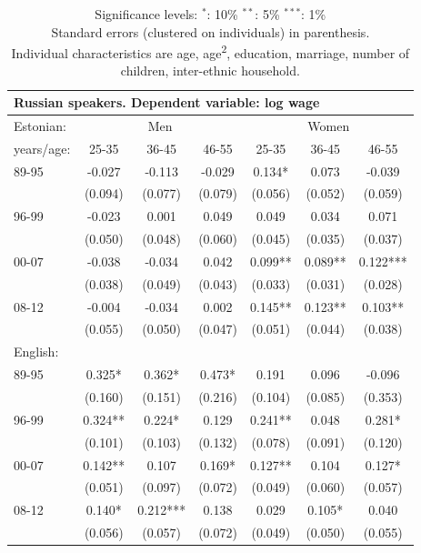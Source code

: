 \documentclass[12pt, a4paper]{article}
\def\tenpc{$^{\ast}$}
\def\fivepc{$^{\ast\ast}$}
\def\onepc{$^{\ast\ast\ast}$}
\newcommand{\legend}{\normalsize{Significance levels:\hspace{1em} \tenpc : 10\% \hspace{1em} \fivepc : 5\% \hspace{1em} \onepc : 1\% \normalsize}}
\newcommand{\modelTwo}{age, age\textsuperscript{2}, education, marriage, number of children, inter-ethnic household}
\begin{document}
\begin{table}[htbp]
\begin{tabular}{lccc|cc c}
          \midrule
		\multicolumn{7}{l}{Russian speakers. Dependent variable: log wage}\\
		\midrule
		Estonian:&\multicolumn{3}{c|}{Men} &\multicolumn{3}{c}{Women}\\
		years/age: & 25-35   & 36-45    & 46-55   & 25-35   & 36-45   & 46-55    \\
		\midrule
		89-95      & -0.027  & -0.113   & -0.029  & 0.134*  & 0.073   & -0.039   \\
		           & (0.094) & (0.077)  & (0.079) & (0.056) & (0.052) & (0.059)  \\
		96-99      & -0.023  & 0.001    & 0.049   & 0.049   & 0.034   & 0.071    \\
		           & (0.050) & (0.048)  & (0.060) & (0.045) & (0.035) & (0.037)  \\
		00-07      & -0.038  & -0.034   & 0.042   & 0.099** & 0.089** & 0.122*** \\
		           & (0.038) & (0.049)  & (0.043) & (0.033) & (0.031) & (0.028)  \\
		08-12      & -0.004  & -0.034   & 0.002   & 0.145** & 0.123** & 0.103**  \\
		           & (0.055) & (0.050)  & (0.047) & (0.051) & (0.044) & (0.038)  \\ \midrule
		English:   &         &          &         &         &         &  
                      \\
         
		89-95      & 0.325*  & 0.362*   & 0.473*  & 0.191   & 0.096   & -0.096   \\
		           & (0.160) & (0.151)  & (0.216) & (0.104) & (0.085) & (0.353)  \\
		96-99      & 0.324** & 0.224*   & 0.129   & 0.241** & 0.048   & 0.281*   \\
		           & (0.101) & (0.103)  & (0.132) & (0.078) & (0.091) & (0.120)  \\
		00-07      & 0.142** & 0.107    & 0.169*  & 0.127** & 0.104   & 0.127*   \\
		           & (0.051) & (0.097)  & (0.072) & (0.049) & (0.060) & (0.057)  \\
		08-12      & 0.140*  & 0.212*** & 0.138   & 0.029   & 0.105*  & 0.040    \\
		           & (0.056) & (0.057)  & (0.072) & (0.049) & (0.050) & (0.055)  \\
		\bottomrule
	\end{tabular}

	\caption*{\legend \\ Standard errors (clustered on individuals) in parenthesis. \\ Individual characteristics are \modelTwo. 	}
	\label{tab:age_group_trend}
\end{table}
\end{document}
